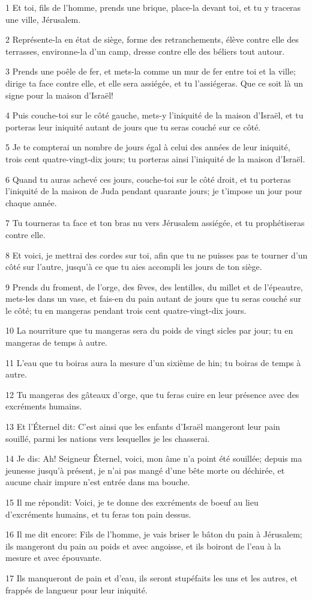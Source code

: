 \par 1 Et toi, fils de l'homme, prends une brique, place-la devant toi, et tu y traceras une ville, Jérusalem.
\par 2 Représente-la en état de siège, forme des retranchements, élève contre elle des terrasses, environne-la d'un camp, dresse contre elle des béliers tout autour.
\par 3 Prends une poêle de fer, et mets-la comme un mur de fer entre toi et la ville; dirige ta face contre elle, et elle sera assiégée, et tu l'assiégeras. Que ce soit là un signe pour la maison d'Israël!
\par 4 Puis couche-toi sur le côté gauche, mets-y l'iniquité de la maison d'Israël, et tu porteras leur iniquité autant de jours que tu seras couché sur ce côté.
\par 5 Je te compterai un nombre de jours égal à celui des années de leur iniquité, trois cent quatre-vingt-dix jours; tu porteras ainsi l'iniquité de la maison d'Israël.
\par 6 Quand tu auras achevé ces jours, couche-toi sur le côté droit, et tu porteras l'iniquité de la maison de Juda pendant quarante jours; je t'impose un jour pour chaque année.
\par 7 Tu tourneras ta face et ton bras nu vers Jérusalem assiégée, et tu prophétiseras contre elle.
\par 8 Et voici, je mettrai des cordes sur toi, afin que tu ne puisses pas te tourner d'un côté sur l'autre, jusqu'à ce que tu aies accompli les jours de ton siège.
\par 9 Prends du froment, de l'orge, des fèves, des lentilles, du millet et de l'épeautre, mets-les dans un vase, et fais-en du pain autant de jours que tu seras couché sur le côté; tu en mangeras pendant trois cent quatre-vingt-dix jours.
\par 10 La nourriture que tu mangeras sera du poids de vingt sicles par jour; tu en mangeras de temps à autre.
\par 11 L'eau que tu boiras aura la mesure d'un sixième de hin; tu boiras de temps à autre.
\par 12 Tu mangeras des gâteaux d'orge, que tu feras cuire en leur présence avec des excréments humains.
\par 13 Et l'Éternel dit: C'est ainsi que les enfants d'Israël mangeront leur pain souillé, parmi les nations vers lesquelles je les chasserai.
\par 14 Je dis: Ah! Seigneur Éternel, voici, mon âme n'a point été souillée; depuis ma jeunesse jusqu'à présent, je n'ai pas mangé d'une bête morte ou déchirée, et aucune chair impure n'est entrée dans ma bouche.
\par 15 Il me répondit: Voici, je te donne des excréments de boeuf au lieu d'excréments humains, et tu feras ton pain dessus.
\par 16 Il me dit encore: Fils de l'homme, je vais briser le bâton du pain à Jérusalem; ils mangeront du pain au poids et avec angoisse, et ils boiront de l'eau à la mesure et avec épouvante.
\par 17 Ils manqueront de pain et d'eau, ils seront stupéfaits les uns et les autres, et frappés de langueur pour leur iniquité.

